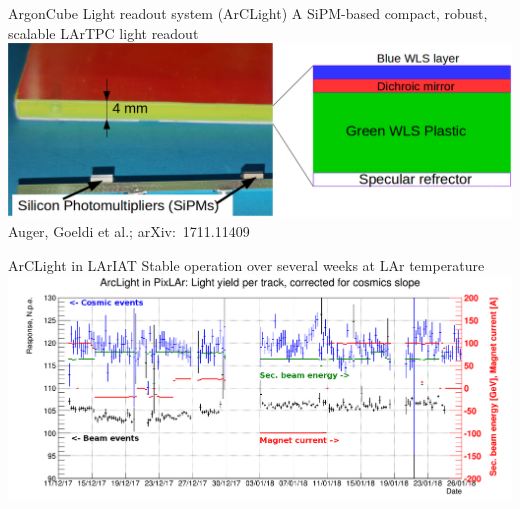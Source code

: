 \documentclass[]{beamer}
\newcommand*{\emphcoltitle}{blue}
\newcommand*{\AC}{{ArgonCube}}
\newcommand*{\AL}{{ArCLight}}
\newcommand*{\lariat}{{LArIAT}}
\newcommand*{\lar}{{LAr}}
\newcommand*{\lartpc}{{LArTPC}}
\begin{document}
\begin{frame}{\AC{} Light readout system (\AL{})}{\color{\emphcoltitle} A SiPM-based compact, robust, scalable \lartpc{} light readout}
	\centering
	\includegraphics[width=\textwidth]{arclight/structure}\\
	{\tiny Auger, Goeldi et al.; arXiv:~1711.11409~\cite{arclight}}
\end{frame}

\begin{frame}{\AL{} in \lariat{}}{\color{\emphcoltitle} Stable operation over several weeks at \lar{} temperature}
	\centering
	\includegraphics[viewport=0 0 1648 690, clip, width=\textwidth]{arclight/stability_cosm_beam_mod}
\end{frame}
\end{document}
